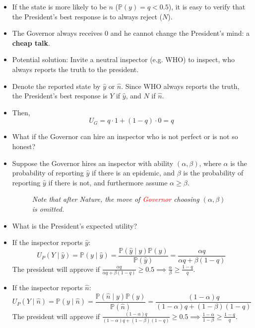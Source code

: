 \documentclass[notitlepage]{article}
\begin{document}
\begin{itemize}
    \begin{itemize}
        \item If the state is more likely to be \(n\) (\(\mathbb{P}(y) = q<0.5\)), it is easy to verify that the President's best response is to always reject (\(N\)).
        \item The Governor always receives 0 and he cannot change the President's mind: a \textbf{cheap talk}.
        \item Potential solution: Invite a neutral inspector (e.g. WHO) to inspect, who always reports the truth to the president.
        \item Denote the reported state by \(\hat{y}\) or \(\hat{n}\). Since WHO always reports the truth, the President's best response is \(Y\) if \(\hat{y}\), and \(N\) if \(\hat{n}\).
        \item Then,
        \[
        U_G = q \cdot 1 + (1-q) \cdot 0 = q
        \]
        \item What if the Governor can hire an inspector who is not perfect or is not so honest?
        \item Suppose the Governor hires an inspector with ability \((\alpha, \beta)\), where \(\alpha\) is the probability of reporting \(\hat{y}\) if there is an epidemic, and \(\beta\) is the probability of reporting \(\hat{y}\) if there is not, and furthermore assume \(\alpha \ge \beta\).

        \newpage
        \begin{figure}[h]
        \centering
        \resizebox{0.4\textwidth}{!}{
        
        }
        \caption*{\textit{Note that after Nature, the move of \textcolor{red}{Governor} choosing \((\alpha, \beta)\) is omitted.}}
        \end{figure}


    \item What is the President's expected utility?
    \item If the inspector reports \(\hat{y}\):
    \[
        U_P(Y \mid \hat{y}) = \mathbb{P}(y \mid \hat{y}) = \frac{\mathbb{P}(\hat{y} \mid y)\mathbb{P}(y)}{\mathbb{P}(\hat{y})} = \frac{\alpha q}{\alpha q + \beta(1-q)}
    \]
    The president will approve if \(\frac{\alpha q}{\alpha q + \beta(1-q)} \ge 0.5 \implies \frac{\alpha}{\beta} \ge \frac{1-q}{q}\).
    
    \item If the inspector reports \(\hat{n}\):
    \[
        U_P(Y \mid \hat{n}) = \mathbb{P}(y \mid \hat{n}) = \frac{\mathbb{P}(\hat{n} \mid y)\mathbb{P}(y)}{\mathbb{P}(\hat{n})} = \frac{(1-\alpha) q}{(1-\alpha) q + (1-\beta) (1-q)}
    \]
    The president will approve if \(\frac{(1-\alpha) q}{(1-\alpha) q + (1-\beta) (1-q)} \ge 0.5 \implies \frac{1-\alpha}{1-\beta} \ge \frac{1-q}{q}\).


\end{itemize}
\end{itemize}
\end{document}
